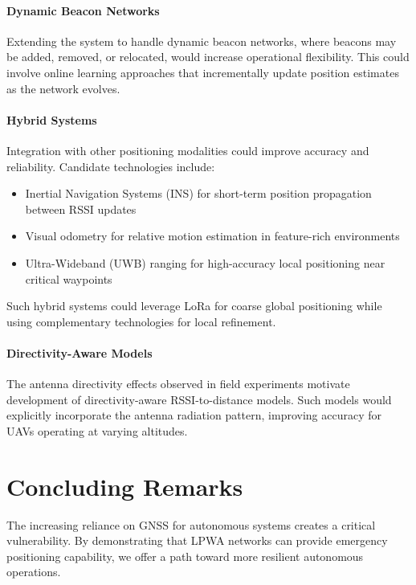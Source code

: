 \documentclass[master,final,11pt]{iscs-thesis}
\begin{document}
\paragraph{Dynamic Beacon Networks}
Extending the system to handle dynamic beacon networks, where beacons may be added, removed, or relocated, would increase operational flexibility.
This could involve online learning approaches that incrementally update position estimates as the network evolves.

\paragraph{Hybrid Systems}
Integration with other positioning modalities could improve accuracy and reliability.
Candidate technologies include:
\begin{itemize}
    \item Inertial Navigation Systems (INS) for short-term position propagation between RSSI updates
    \item Visual odometry for relative motion estimation in feature-rich environments
    \item Ultra-Wideband (UWB) ranging for high-accuracy local positioning near critical waypoints
\end{itemize}
Such hybrid systems could leverage LoRa for coarse global positioning while using complementary technologies for local refinement.

\paragraph{Directivity-Aware Models}
The antenna directivity effects observed in field experiments motivate development of directivity-aware RSSI-to-distance models.
Such models would explicitly incorporate the antenna radiation pattern, improving accuracy for UAVs operating at varying altitudes.

\section{Concluding Remarks}
\label{sec:concluding_remarks}

The increasing reliance on GNSS for autonomous systems creates a critical vulnerability.
By demonstrating that LPWA networks can provide emergency positioning capability, we offer a path toward more resilient autonomous operations.
\end{document}
